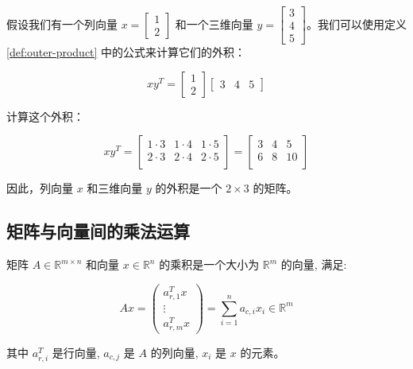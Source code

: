 \documentclass[lang=cn,newtx,10pt,scheme=chinese]{elegantbook}
\begin{document}
\begin{exercise}
    假设我们有一个列向量 $x = \begin{bmatrix} 1 \\ 2 \end{bmatrix}$ 和一个三维向量 $y = \begin{bmatrix} 3 \\ 4 \\ 5 \end{bmatrix}$。我们可以使用定义 \ref{def:outer-product} 中的公式来计算它们的外积：

\[
x y^T = \begin{bmatrix} 1 \\ 2 \end{bmatrix} \begin{bmatrix} 3 & 4 & 5 \end{bmatrix}
\]

计算这个外积：

\[
x y^T = \begin{bmatrix}
1 \cdot 3 & 1 \cdot 4 & 1 \cdot 5 \\
2 \cdot 3 & 2 \cdot 4 & 2 \cdot 5 \\
\end{bmatrix} = \begin{bmatrix}
3 & 4 & 5 \\
6 & 8 & 10 \\
\end{bmatrix}
\]

因此，列向量 $x$ 和三维向量 $y$ 的外积是一个 $2 \times 3$ 的矩阵。
\end{exercise}

\subsection{矩阵与向量间的乘法运算}

\begin{definition}[矩阵与向量间的乘法运算] \label{def:mat-vec-multi}

矩阵 $A \in \mathbb{R}^{m \times n}$ 和向量 $x \in \mathbb{R}^n$ 的乘积是一个大小为 $\mathbb{R}^m$ 的向量, 满足:

$$
A x=\left(\begin{array}{c}
a_{r, 1}^T x \\
\vdots \\
a_{r, m}^T x
\end{array}\right)=\sum_{i=1}^n a_{c, i} x_i \in \mathbb{R}^m
$$

其中 $a_{r, i}^T$ 是行向量, $a_{c, j}$ 是 $A$ 的列向量, $x_i$ 是 $x$ 的元素。
\end{definition}
\end{document}
